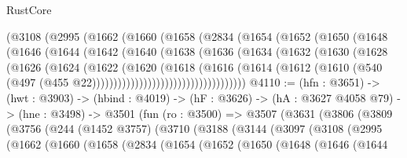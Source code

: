 \begin{lexlean}{RustCore}
\begin{coremodule}
            (@3108
              (@2995
                (@1662
                  (@1660
                    (@1658
                      (@2834
                        (@1654
                          (@1652
                            (@1650
                              (@1648
                                (@1646
                                  (@1644
                                    (@1642
                                      (@1640
                                        (@1638
                                          (@1636
                                            (@1634
                                              (@1632
                                                (@1630
                                                  (@1628
                                                    (@1626
                                                      (@1624
                                                        (@1622
                                                          (@1620
                                                            (@1618
                                                              (@1616
                                                                (@1614
                                                                  (@1612
                                                                    (@1610
                                                                      (@540
                                                                        (@497
                                                                          (@455
                                                                            @22))))))))))))))))))))))))))))))))))))
@4110 := (hfn : @3651) ->
  (hwt : @3903) ->
  (hbind : @4019) ->
  (hF : @3626) ->
  (hA : @3627 @4058 @79) ->
  (hne : @3498) ->
  @3501
    (fun (ro : @3500) =>
    @3507
      (@3631
        (@3806
          (@3809
            (@3756
              (@244
                (@1452 @3757)
                (@3710
                  (@3188
                    (@3144
                      (@3097
                        (@3108
                          (@2995
                            (@1662
                              (@1660
                                (@1658
                                  (@2834
                                    (@1654
                                      (@1652
                                        (@1650
                                          (@1648
                                            (@1646
                                              (@1644

\end{coremodule}
\end{lexlean}
